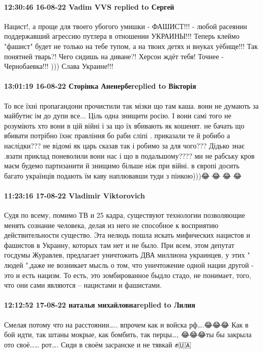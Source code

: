  
 
 
 
 

\paragraph{12:30:46 16-08-22 Vadim VVS replied to Сергей}

Нацист!, а проще для твоего убогого умишки - ФАШИСТ!!! - любой расеянин
поддержавший агрессию путлера в отношении УКРАИНЫ!!! Теперь клеймо "фашист"
будет не только на тебе тупом, а на твоих детях и внуках уёбище!!! Так понятней
тварь?! Чего сидишь на диване?! Херсон ждёт тебя! Точнее - Чернобаевка!!! )))
Слава Украине!!!

\paragraph{13:01:19 16-08-22 Сторінка Аненербеreplied to Вікторія}

То все їхні пропагандони прочистили так мізки що там каша. вони не думають за
майбутнє ім до дупи все... Ціль одна знищити росію. І вони самі того не
розуміють хто вони в цій війні і за що їх вбивають як кошенят. не бачать що
вбивати потрібно їхнє правління бо раби сліпі . приказали те й робибо а
наслідки??? не відомі як царь сказав так і робимо за для чого??? Дідько знає
.взати приклад поневолили вони нас і що в подальшому???? ми не рабську кров
маєм будемо партизанити й знищимо більше ніж при війні. в європі досить багато
українців подають їм каву наплювавши туди з пінкою)))😂 😂 😂 😂

\paragraph{11:23:16 17-08-22 Vladimir Viktorovich}

Судя по всему, помимо ТВ и 25 кадра, существуют технологии позволяющие менять сознание человека, делая из него не способное к восприятию действительности существо. Эта нелюдь пошла искать мифических нацистов и
фашистов в Украину, которых там нет и не было.                         При всем, этом депутат госдумы Журавлев,  предлагает уничтожить ДВА миллиона украинцев, у этих " людей ",даже не возникает мысль о том, что уничтожение одной нации другой - это и есть нацизм. То есть, это зомбированное быдло стадо, не понимает, того, что они сами являются – нацистами и фашистами.

\paragraph{12:12:52 17-08-22 наталья михайловнаreplied to Лилия}

Смелая потому что на расстоянии….. впрочем как и войска рф….😂😂😂 Как в бой
идти, так штаны мокрые, как бомбить, так перцы…, 😂😂😂ты бы закрыла ото своё……
рот…. Сиди в своём засранске и не тявкай ✊🇺🇦
